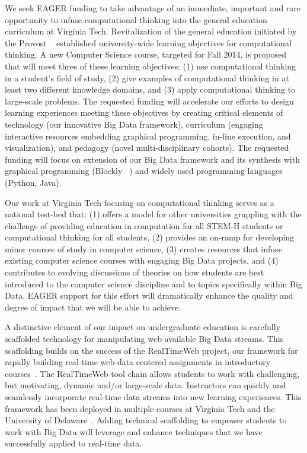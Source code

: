 \documentclass[11pt]{article}
\begin{document}
We seek EAGER funding to take advantage of an immediate, important and rare
opportunity to infuse computational thinking into the general
education curriculum at Virginia Tech. Revitalization of the general education initiated by the Provost ~\cite{vt-horizon} established university-wide learning objectives for computational thinking. A new Computer Science course, targeted for Fall 2014, is proposed that will meet three of these learning objectives: (1) use computational thinking in a student's field of study, (2) give examples of computational thinking in at least two different knowledge domains, and (3) apply computational thinking to large-scale problems. The requested funding will accelerate our efforts to design learning experiences meeting these objectives by creating critical elements of technology (our innovative Big Data framework), curriculum (engaging interactive resources embedding graphical programming, in-line execution, and visualization), and pedagogy (novel multi-disciplinary cohorts). The requested funding will focus on extension of our Big Data framework and its synthesis with graphical programming (Blockly ~\cite{blockly}) and widely used programming languages (Python, Java).

Our work at Virginia Tech focusing on computational thinking serves as a national test-bed that:
(1) offers
a model for other universities grappling with the challenge of
providing education in computation for all STEM-H students or computational
thinking for all students, (2) provides an on-ramp for developing
minor courses of study in computer science, (3) creates resources that infuse existing computer science courses with engaging Big Data projects, and (4) contributes to
evolving discussions of theories on how students are best introduced
to the computer science discipline and to topics specifically within
Big Data. EAGER support for this effort will dramatically
enhance the quality and degree of impact that we will be able to
achieve.

A distinctive element of our impact on undergraduate education is
carefully scaffolded technology for manipulating web-available Big
Data streams.
This scaffolding builds on the success of the RealTimeWeb project, our framework for rapidly building real-time web-data centered assignments in introductory courses~\cite{bart-rtw}.
The RealTimeWeb tool chain allows students to work with challenging, but motivating, dynamic and/or large-scale data.
Instructors can quickly and seamlessly incorporate real-time data streams into new learning experiences.
This framework has been deployed in multiple courses at Virginia Tech and the University of Delaware~\cite{bart-rtw-success}.
Adding technical scaffolding to empower students to work with Big Data will leverage and enhance techniques that we have successfully applied to real-time data.
\end{document}
